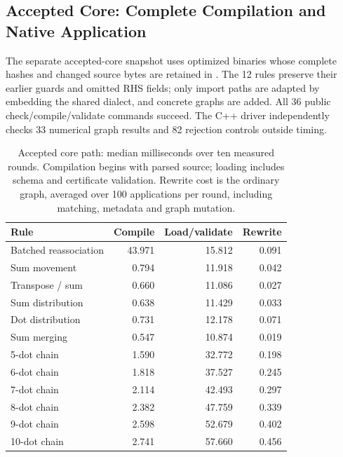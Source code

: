 \subsection{Accepted Core: Complete Compilation and Native Application}
\label{app:accepted-core-results}
The separate accepted-core snapshot uses optimized binaries whose complete hashes
and changed source bytes are retained in .
The 12 rules preserve their earlier guards and omitted RHS fields; only import
paths are adapted by embedding the shared dialect, and concrete graphs are added.
All 36 public check/compile/validate commands succeed. The C++ driver independently
checks 33 numerical graph results and 82 rejection controls outside timing.

\begin{table}[!htbp]
\caption{Accepted core path: median milliseconds over ten measured rounds.
Compilation begins with parsed source; loading includes schema and certificate
validation. Rewrite cost is the ordinary graph, averaged over 100 applications
per round, including matching, metadata and graph mutation.}
\label{tab:accepted-core-cost}
\small
\begin{tabularx}{\linewidth}{@{}Yrrr@{}}\toprule
Rule & Compile & Load/validate & Rewrite\\\midrule
Batched reassociation & 43.971 & 15.812 & 0.091\\
Sum movement & 0.794 & 11.918 & 0.042\\
Transpose / sum & 0.660 & 11.086 & 0.027\\
Sum distribution & 0.638 & 11.429 & 0.033\\
Dot distribution & 0.731 & 12.178 & 0.071\\
Sum merging & 0.547 & 10.874 & 0.019\\
5-dot chain & 1.590 & 32.772 & 0.198\\
6-dot chain & 1.818 & 37.527 & 0.245\\
7-dot chain & 2.114 & 42.493 & 0.297\\
8-dot chain & 2.382 & 47.759 & 0.339\\
9-dot chain & 2.598 & 52.679 & 0.402\\
10-dot chain & 2.741 & 57.660 & 0.456\\
\bottomrule\end{tabularx}
\end{table}

